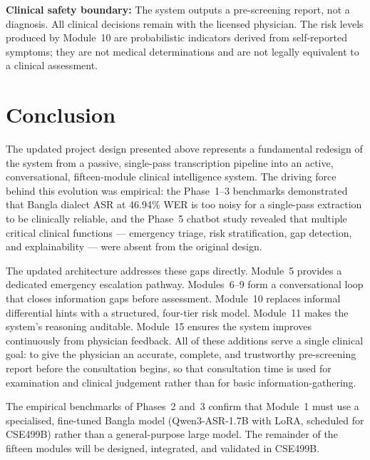 \documentclass[12pt,a4paper]{article}
\begin{document}
\textbf{Clinical safety boundary:} The system outputs a pre-screening
report, not a diagnosis. All clinical decisions remain with the licensed
physician. The risk levels produced by Module~10 are probabilistic
indicators derived from self-reported symptoms; they are not medical
determinations and are not legally equivalent to a clinical assessment.

\section{Conclusion}

The updated project design presented above represents a fundamental
redesign of the system from a passive, single-pass transcription
pipeline into an active, conversational, fifteen-module clinical
intelligence system. The driving force behind this evolution was
empirical: the Phase~1--3 benchmarks demonstrated that Bangla dialect
ASR at 46.94\% WER is too noisy for a single-pass extraction to be
clinically reliable, and the Phase~5 chatbot study revealed that
multiple critical clinical functions --- emergency triage, risk
stratification, gap detection, and explainability --- were absent from
the original design.

The updated architecture addresses these gaps directly. Module~5 provides
a dedicated emergency escalation pathway. Modules~6--9 form a
conversational loop that closes information gaps before assessment.
Module~10 replaces informal differential hints with a structured,
four-tier risk model. Module~11 makes the system's reasoning auditable.
Module~15 ensures the system improves continuously from physician
feedback. All of these additions serve a single clinical goal: to
give the physician an accurate, complete, and trustworthy pre-screening
report before the consultation begins, so that consultation time is used
for examination and clinical judgement rather than for basic
information-gathering.

The empirical benchmarks of Phases~2 and~3 confirm that
Module~1 must use a specialised, fine-tuned Bangla model
(Qwen3-ASR-1.7B with LoRA, scheduled for CSE499B) rather than a
general-purpose large model. The remainder of the fifteen modules will
be designed, integrated, and validated in CSE499B.
\end{document}
